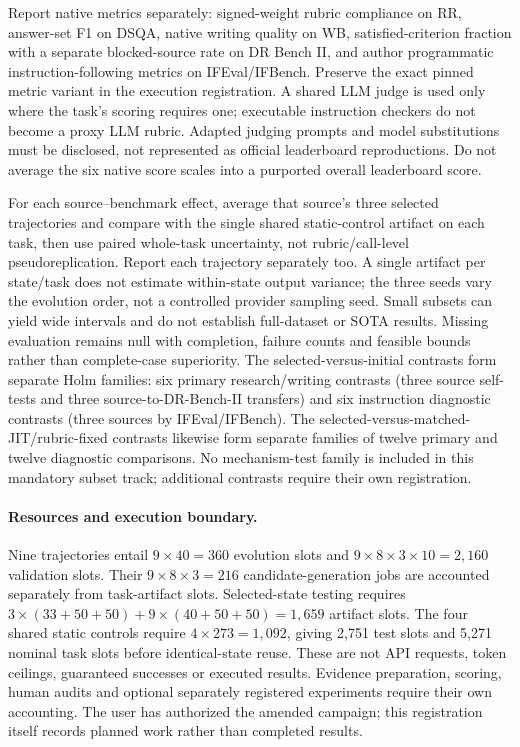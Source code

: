 Report native metrics separately: signed-weight rubric compliance on RR,
answer-set F1 on DSQA, native writing quality on WB, satisfied-criterion
fraction with a separate blocked-source rate on DR Bench II, and author
programmatic instruction-following metrics on IFEval/IFBench. Preserve
the exact pinned metric variant in the execution registration. A shared
LLM judge is used only where the task's scoring requires one; executable
instruction checkers do not become a proxy LLM rubric. Adapted judging
prompts and model substitutions must be disclosed, not represented as
official leaderboard reproductions. Do not average the six native score
scales into a purported overall leaderboard score.

For each source--benchmark effect, average that source's three selected trajectories and
compare with the single shared static-control artifact on each task, then
use paired whole-task uncertainty, not rubric/call-level pseudoreplication.
Report each trajectory separately too. A single artifact per state/task
does not estimate within-state output variance; the three seeds vary the
evolution order, not a controlled provider sampling seed. Small subsets
can yield wide intervals and do not establish full-dataset or SOTA results.
Missing evaluation remains null with completion,
failure counts and feasible bounds rather than complete-case superiority.
The selected-versus-initial contrasts form separate Holm families: six
primary research/writing contrasts (three source self-tests and three
source-to-DR-Bench-II transfers) and six instruction diagnostic contrasts
(three sources by IFEval/IFBench). The selected-versus-matched-JIT/rubric-fixed
contrasts likewise form separate families of twelve primary and twelve
diagnostic comparisons. No mechanism-test family is included in this
mandatory subset track; additional contrasts require their own registration.

\paragraph{Resources and execution boundary.}
Nine trajectories entail $9\times40=360$ evolution slots and
$9\times8\times3\times10=2,160$ validation slots. Their
$9\times8\times3=216$ candidate-generation jobs are accounted separately
from task-artifact slots. Selected-state testing requires
$3\times(33+50+50)+9\times(40+50+50)=1,659$ artifact slots. The four
shared static controls require $4\times273=1,092$, giving 2,751 test slots
and 5,271 nominal task slots before identical-state reuse. These are not API requests, token ceilings, guaranteed
successes or executed results. Evidence preparation, scoring, human audits
and optional separately registered experiments require their own accounting.
The user has authorized the amended campaign; this registration itself
records planned work rather than completed results.

